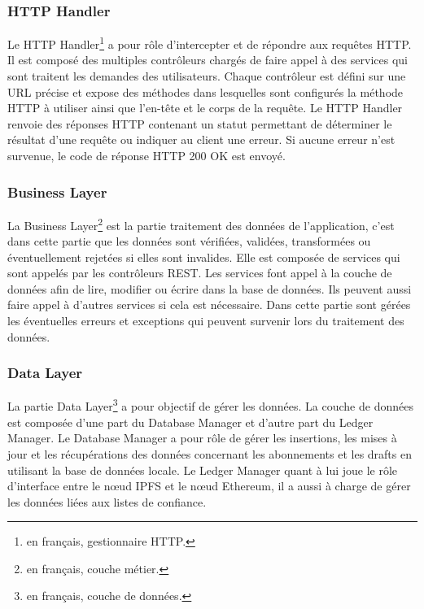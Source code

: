\documentclass{tnreport}
\begin{document}
\subsubsection{HTTP Handler}

Le HTTP Handler\footnote{en français, gestionnaire HTTP.} a pour rôle d'intercepter et de répondre aux requêtes HTTP. Il est composé des multiples contrôleurs chargés de faire appel à des services qui sont traitent les demandes des utilisateurs. Chaque contrôleur est défini sur une URL précise et expose des méthodes dans lesquelles sont configurés la méthode HTTP à utiliser ainsi que l'en-tête et le corps de la requête. Le HTTP Handler renvoie des réponses HTTP contenant un statut permettant de déterminer le résultat d'une requête ou indiquer au client une erreur. Si aucune erreur n'est survenue, le code de réponse HTTP 200 OK est envoyé.

\subsubsection{Business Layer}

La Business Layer\footnote{en français, couche métier.} est la partie traitement des données de l'application, c'est dans cette partie que les données sont vérifiées, validées, transformées ou éventuellement rejetées si elles sont invalides. Elle est composée de services qui sont appelés par les contrôleurs REST. Les services font appel à la couche de données afin de lire, modifier ou
écrire dans la base de données. Ils peuvent aussi faire appel à d'autres services si cela est nécessaire. Dans cette partie sont gérées les éventuelles erreurs et exceptions qui peuvent survenir lors du traitement des données.

\subsubsection{Data Layer}

La partie Data Layer\footnote{en français, couche de données.} a pour objectif de gérer les données. La couche de données est composée d'une part du Database Manager et d'autre part du Ledger Manager. Le Database Manager a pour rôle de gérer les insertions, les mises à jour et les récupérations des données concernant les abonnements et les drafts en utilisant la base de données locale. Le Ledger Manager quant à lui joue le rôle d'interface entre le nœud IPFS et le nœud Ethereum, il a aussi à charge de gérer les données liées aux listes de confiance.
\end{document}
